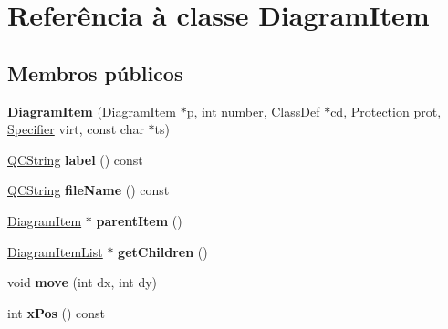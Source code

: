 \hypertarget{class_diagram_item}{\section{Referência à classe Diagram\-Item}
\label{class_diagram_item}
}
\subsection*{Membros públicos}
\begin{DoxyCompactItemize}
\item 
\hypertarget{class_diagram_item_a3fd516891ec2a8f0b704ba619f4515d2}{{\bfseries Diagram\-Item} (\hyperlink{class_diagram_item}{Diagram\-Item} $\ast$p, int number, \hyperlink{class_class_def}{Class\-Def} $\ast$cd, \hyperlink{types_8h_a90e352184df58cd09455fe9996cd4ded}{Protection} prot, \hyperlink{types_8h_ab16236bdd10ddf4d73a9847350f0017e}{Specifier} virt, const char $\ast$ts)}\label{class_diagram_item_a3fd516891ec2a8f0b704ba619f4515d2}

\item 
\hypertarget{class_diagram_item_a9205822f6142d072844690dc09ab24bd}{\hyperlink{class_q_c_string}{Q\-C\-String} {\bfseries label} () const }\label{class_diagram_item_a9205822f6142d072844690dc09ab24bd}

\item 
\hypertarget{class_diagram_item_a11c453b194f4619b5dedc0c80187a91f}{\hyperlink{class_q_c_string}{Q\-C\-String} {\bfseries file\-Name} () const }\label{class_diagram_item_a11c453b194f4619b5dedc0c80187a91f}

\item 
\hypertarget{class_diagram_item_a3ac1427f77b30cd854a2e9fb4ea546ef}{\hyperlink{class_diagram_item}{Diagram\-Item} $\ast$ {\bfseries parent\-Item} ()}\label{class_diagram_item_a3ac1427f77b30cd854a2e9fb4ea546ef}

\item 
\hypertarget{class_diagram_item_a1eb5e43f2c03b3b55e40c9075f663438}{\hyperlink{class_diagram_item_list}{Diagram\-Item\-List} $\ast$ {\bfseries get\-Children} ()}\label{class_diagram_item_a1eb5e43f2c03b3b55e40c9075f663438}

\item 
\hypertarget{class_diagram_item_a197790ff9182adf29b482ea8fa2c9828}{void {\bfseries move} (int dx, int dy)}\label{class_diagram_item_a197790ff9182adf29b482ea8fa2c9828}

\item 
\hypertarget{class_diagram_item_aaadfa6cc06bbdd43c8d81e10e80f621e}{int {\bfseries x\-Pos} () const }\label{class_diagram_item_aaadfa6cc06bbdd43c8d81e10e80f621e}


\end{DoxyCompactItemize}
